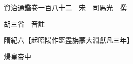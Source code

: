 










 


 
 


 

  
  
  
  
  





  
  
  
  
  
 
  

  

  
  
  



  

 
 

  
   




  

  
  


  　　資治通鑑卷一百八十二　宋　司馬光　撰

　　胡三省　音註

　　隋紀六【起昭陽作噩盡旃蒙大淵獻凡三年】

　　煬皇帝中

